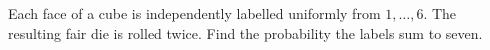 Each face of a cube is independently labelled uniformly from $1,\ldots,6$. The resulting fair die is rolled twice. Find the probability the labels sum to seven.
